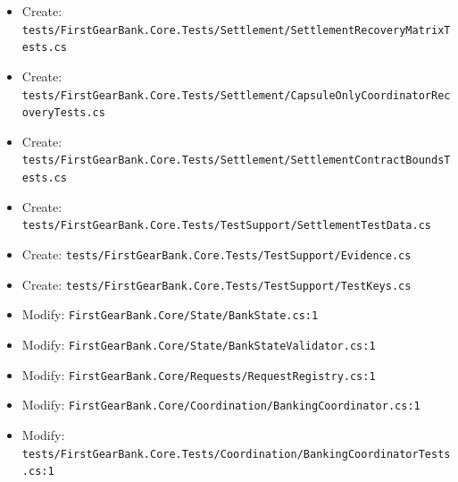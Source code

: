 \documentclass[
  10pt,
  letterpaper,
]{article}
\begin{document}
\begin{itemize}
\item
  Create:
  \texttt{tests/}\allowbreak{}\texttt{FirstGearBank.}\allowbreak{}\texttt{Core.}\allowbreak{}\texttt{Tests/}\allowbreak{}\texttt{Settlement/}\allowbreak{}\texttt{SettlementRecoveryMatrixTests.}\allowbreak{}\texttt{cs}
\item
  Create:
  \texttt{tests/}\allowbreak{}\texttt{FirstGearBank.}\allowbreak{}\texttt{Core.}\allowbreak{}\texttt{Tests/}\allowbreak{}\texttt{Settlement/}\allowbreak{}\texttt{CapsuleOnlyCoordinatorRecoveryTests.}\allowbreak{}\texttt{cs}
\item
  Create:
  \texttt{tests/}\allowbreak{}\texttt{FirstGearBank.}\allowbreak{}\texttt{Core.}\allowbreak{}\texttt{Tests/}\allowbreak{}\texttt{Settlement/}\allowbreak{}\texttt{SettlementContractBoundsTests.}\allowbreak{}\texttt{cs}
\item
  Create:
  \texttt{tests/}\allowbreak{}\texttt{FirstGearBank.}\allowbreak{}\texttt{Core.}\allowbreak{}\texttt{Tests/}\allowbreak{}\texttt{TestSupport/}\allowbreak{}\texttt{SettlementTestData.}\allowbreak{}\texttt{cs}
\item
  Create:
  \texttt{tests/}\allowbreak{}\texttt{FirstGearBank.}\allowbreak{}\texttt{Core.}\allowbreak{}\texttt{Tests/}\allowbreak{}\texttt{TestSupport/}\allowbreak{}\texttt{Evidence.}\allowbreak{}\texttt{cs}
\item
  Create:
  \texttt{tests/}\allowbreak{}\texttt{FirstGearBank.}\allowbreak{}\texttt{Core.}\allowbreak{}\texttt{Tests/}\allowbreak{}\texttt{TestSupport/}\allowbreak{}\texttt{TestKeys.}\allowbreak{}\texttt{cs}
\item
  Modify:
  \texttt{FirstGearBank.}\allowbreak{}\texttt{Core/}\allowbreak{}\texttt{State/}\allowbreak{}\texttt{BankState.}\allowbreak{}\texttt{cs:}\allowbreak{}\texttt{1}
\item
  Modify:
  \texttt{FirstGearBank.}\allowbreak{}\texttt{Core/}\allowbreak{}\texttt{State/}\allowbreak{}\texttt{BankStateValidator.}\allowbreak{}\texttt{cs:}\allowbreak{}\texttt{1}
\item
  Modify:
  \texttt{FirstGearBank.}\allowbreak{}\texttt{Core/}\allowbreak{}\texttt{Requests/}\allowbreak{}\texttt{RequestRegistry.}\allowbreak{}\texttt{cs:}\allowbreak{}\texttt{1}
\item
  Modify:
  \texttt{FirstGearBank.}\allowbreak{}\texttt{Core/}\allowbreak{}\texttt{Coordination/}\allowbreak{}\texttt{BankingCoordinator.}\allowbreak{}\texttt{cs:}\allowbreak{}\texttt{1}
\item
  Modify:
  \texttt{tests/}\allowbreak{}\texttt{FirstGearBank.}\allowbreak{}\texttt{Core.}\allowbreak{}\texttt{Tests/}\allowbreak{}\texttt{Coordination/}\allowbreak{}\texttt{BankingCoordinatorTests.}\allowbreak{}\texttt{cs:}\allowbreak{}\texttt{1}

\end{itemize}
\end{document}
